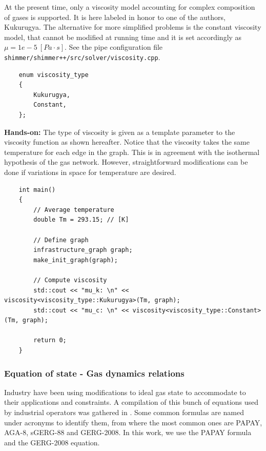 At the present time, only a  viscosity model accounting for complex composition of gases is supported. It is here labeled in honor to one of the authors, Kukurugya. The alternative for more simplified problems is the constant viscosity model, that cannot be modified at running time and it is set accordingly as $\mu = 1e-5~[Pa \cdot s]$. See the pipe configuration file \texttt{shimmer/shimmer++/src/solver/viscosity.cpp}.
\begin{verbatim}
    enum viscosity_type
    {
        Kukurugya,
        Constant,
    };
\end{verbatim}

\textbf{Hands-on:}
The type of viscosity is given as a template parameter to the viscosity function as shown hereafter. Notice that the viscosity takes the same temperature for each edge in the graph. This is in agreement with the isothermal hypothesis of the gas network. However, straightforward modifications can be done if variations in space for temperature are desired.  
\begin{verbatim}
    int main()
    {
        // Average temperature
        double Tm = 293.15; // [K]  

        // Define graph
        infrastructure_graph graph;
        make_init_graph(graph);

        // Compute viscosity
        std::cout << "mu_k: \n" << viscosity<viscosity_type::Kukurugya>(Tm, graph);
        std::cout << "mu_c: \n" << viscosity<viscosity_type::Constant>(Tm, graph);

        return 0;
    }
\end{verbatim}

\subsubsection{Equation of state - Gas dynamics relations} \label{sec:eos}
Industry have been using modifications to ideal gas state to accommodate to their applications and constraints. A compilation of this bunch of equations used by industrial operators was gathered in \cite{Guillot2015}. Some common formulas are named under acronyms to identify them, from where the most common ones are PAPAY, AGA-8,  sGERG-88 and GERG-2008. In this work, we use the PAPAY formula and the GERG-2008 equation.

